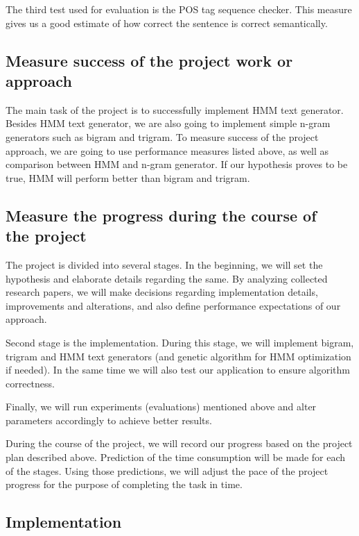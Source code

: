 \documentclass[a4paper,12pt]{article}
\begin{document}
The third test used for evaluation is the POS tag sequence checker. This measure 
gives us a good estimate of how correct the sentence is correct semantically.

\subsection {Measure success of the project work or approach}

The main task of the project is to successfully implement HMM text generator.
Besides HMM text generator, we are also going to implement simple n-gram
generators such as bigram and trigram. To measure success of the project
approach, we are going to use performance measures listed above, as well as
comparison between HMM and n-gram generator. If our hypothesis proves to be
true, HMM will perform better than bigram and trigram.
\subsection {Measure the progress during the course of\\ the project}

The project is divided into several stages. In the beginning, we will set the
hypothesis and elaborate details regarding the same. By analyzing collected
research papers, we will make decisions regarding implementation details,
improvements and alterations, and also define performance expectations of our
approach.

Second stage is the implementation. During this stage, we will implement bigram,
trigram and HMM text generators (and genetic algorithm for HMM optimization if
needed). In the same time we will also test our application to ensure algorithm
correctness.

Finally, we will run experiments (evaluations) mentioned above and alter
parameters accordingly to achieve better results.

During the course of the project, we will record our progress based on the
project plan described above. Prediction of the time consumption will be made
for each of the stages. Using those predictions, we will adjust the pace of the
project progress for the purpose of completing the task in time.

\subsection{Implementation}
\label{sec:impl}
\end{document}
